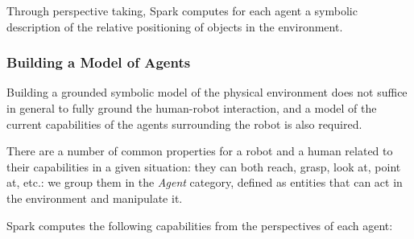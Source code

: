 \documentclass[preprint,3p,times]{elsarticle}
\begin{document}
Through perspective taking, {\sc Spark} computes for each agent a symbolic
description of the relative positioning of objects in the environment.

\subsubsection{Building a Model of Agents}
\label{sect|grounding_agents}

Building a grounded symbolic model of the physical environment does not suffice
in general to fully ground the human-robot interaction, and a model of the
current capabilities of the agents surrounding the robot is also required.

There are a number of common properties for a robot and a human related to
their capabilities in a given situation: they can both reach, grasp, look at,
point at, etc.: we group them in the \emph{Agent} category, defined as entities
that can act in the environment and manipulate it.

{\sc Spark} computes the following capabilities from the perspectives of each agent:
\end{document}
